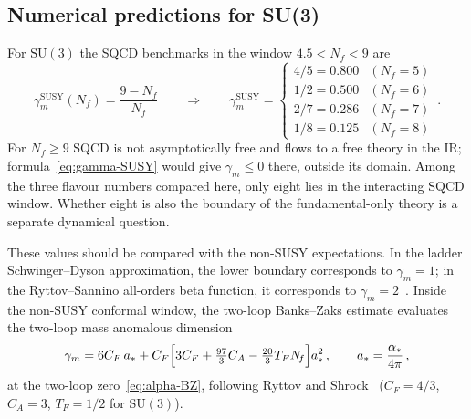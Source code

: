 \documentclass[11pt,a4paper]{article}
\theoremstyle{plain}
\theoremstyle{definition}
\theoremstyle{remark}
\newcommand{\Nf}{N_{\!f}}
\newcommand{\SU}[1]{\mathrm{SU}(#1)}
\begin{document}
\subsection{Numerical predictions for SU(3)}
\label{ssec:gamma-numerical}

For $\SU{3}$ the SQCD benchmarks in the window $4.5 < \Nf < 9$ are
\begin{equation}\label{eq:gamma-values}
  \gamma_m^{\mathrm{SUSY}}(\Nf) = \frac{9 - \Nf}{\Nf}
  \qquad \Longrightarrow \qquad
  \gamma_m^{\mathrm{SUSY}} =
  \begin{cases}
    4/5 = 0.800 & (\Nf = 5) \\
    1/2 = 0.500 & (\Nf = 6) \\
    2/7 = 0.286 & (\Nf = 7) \\
    1/8 = 0.125 & (\Nf = 8)
  \end{cases}\,.
\end{equation}
For $\Nf \geq 9$ SQCD is not asymptotically free and flows to a free
theory in the IR; formula~\eqref{eq:gamma-SUSY} would give
$\gamma_m \leq 0$ there, outside its domain.  Among the three
flavour numbers compared here, only eight lies in the interacting SQCD
window.  Whether eight is also the boundary of the fundamental-only
theory is a separate dynamical question.

These values should be compared with the non-SUSY expectations.  In the
ladder Schwinger--Dyson approximation, the lower boundary corresponds
to $\gamma_m = 1$; in the Ryttov--Sannino all-orders beta function, it
corresponds to $\gamma_m = 2$~\cite{RS2008}.  Inside the non-SUSY
conformal window, the two-loop Banks--Zaks estimate evaluates the
two-loop mass anomalous dimension
\begin{equation}\label{eq:gamma-BZ}
  \gamma_m = 6C_F\,a_* + C_F\Bigl[3C_F + \tfrac{97}{3}C_A
  - \tfrac{20}{3}T_F\Nf\Bigr]a_*^2\,,
  \qquad a_* = \frac{\alpha_*}{4\pi}\,,
\end{equation}
at the two-loop zero~\eqref{eq:alpha-BZ}, following Ryttov and
Shrock~\cite{RyttovShrock2011} ($C_F = 4/3$, $C_A = 3$, $T_F = 1/2$ for
$\SU{3}$).
\end{document}
